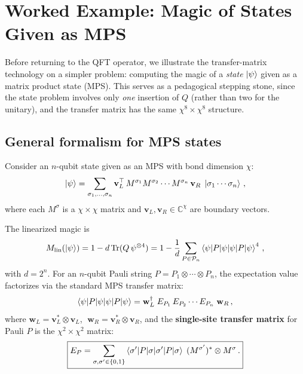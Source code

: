 \documentclass[11pt,a4paper]{article}
\theoremstyle{definition}
\theoremstyle{remark}
\newcommand{\PP}{\mathcal{P}}
\newcommand{\Mlin}{M_{\mathrm{lin}}}
\renewcommand{\Tr}{\mathrm{Tr}}
\begin{document}
\section{Worked Example: Magic of States Given as MPS}
\label{sec:mps_magic}

Before returning to the QFT operator, we illustrate the transfer-matrix technology on a simpler problem: computing the magic of a \emph{state} $\ket{\psi}$ given as a matrix product state (MPS).
This serves as a pedagogical stepping stone, since the state problem involves only \emph{one} insertion of $Q$ (rather than two for the unitary), and the transfer matrix has the same $\chi^8\times\chi^8$ structure.

\subsection{General formalism for MPS states}

Consider an $n$-qubit state given as an MPS with bond dimension $\chi$:
\begin{equation}\label{eq:mps_def}
  \ket{\psi} = \sum_{\sigma_1,\ldots,\sigma_n} \mathbf{v}_L^\top\, M^{\sigma_1} M^{\sigma_2}\cdots M^{\sigma_n}\, \mathbf{v}_R\;\ket{\sigma_1\cdots\sigma_n}\,,
\end{equation}
where each $M^\sigma$ is a $\chi\times\chi$ matrix and $\mathbf{v}_L, \mathbf{v}_R \in \mathbb{C}^\chi$ are boundary vectors.

The linearized magic is
\begin{equation}\label{eq:Mlin_state}
  \Mlin(\ket{\psi}) = 1 - d\,\Tr(Q\,\psi^{\otimes 4})
  = 1 - \frac{1}{d}\sum_{P\in\PP_n} \braket{\psi|P|\psi}^4\,,
\end{equation}
with $d=2^n$.  For an $n$-qubit Pauli string $P = P_1\otimes\cdots\otimes P_n$, the expectation value factorizes via the standard MPS transfer matrix:
\begin{equation}
  \braket{\psi|P|\psi} = \mathbf{w}_L^\dagger\; E_{P_1}\, E_{P_2}\cdots E_{P_n}\;\mathbf{w}_R\,,
\end{equation}
where $\mathbf{w}_L = \mathbf{v}_L^*\otimes\mathbf{v}_L$, $\;\mathbf{w}_R = \mathbf{v}_R^*\otimes\mathbf{v}_R$, and the \textbf{single-site transfer matrix} for Pauli $P$ is the $\chi^2\times\chi^2$ matrix:
\begin{equation}\label{eq:EP_def}
  \boxed{
  E_P = \sum_{\sigma,\sigma'\in\{0,1\}} \braket{\sigma'|P|\sigma}\;(M^{\sigma'})^*\otimes M^\sigma\,.
  }
\end{equation}
\end{document}

